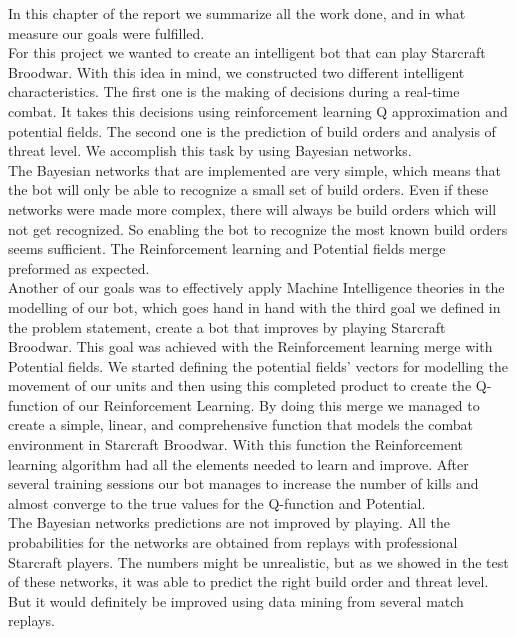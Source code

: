 In this chapter of the report we summarize all the work done, and in what measure our goals were fulfilled. \\

For this project we wanted to create an intelligent bot that can play Starcraft Broodwar. With this idea in mind, we constructed two different intelligent characteristics. The first one is the making of decisions during a real-time combat. It takes this decisions using reinforcement learning Q approximation and potential fields. The second one is the prediction of build orders and analysis of threat level. We accomplish this task by using Bayesian networks. \\

The Bayesian networks that are implemented are very simple, which means that the bot will only be able to recognize a small set of build orders. Even if these networks were made more complex, there will always be build orders which will not get recognized. So enabling the bot to recognize the most known build orders seems sufficient. The Reinforcement learning and Potential fields merge preformed as expected.\\ %

Another of our goals was to effectively apply Machine Intelligence theories in the modelling of our bot, which goes hand in hand with the third goal we defined in the problem statement, create a bot that improves by playing Starcraft Broodwar. This goal was achieved with the Reinforcement learning merge with Potential fields. We started defining the potential fields' vectors for modelling the movement of our units and then using this completed product to create the Q-function of our Reinforcement Learning. By doing this merge we managed to create a simple, linear, and comprehensive function that models the combat environment in Starcraft Broodwar. With this function the Reinforcement learning algorithm had all the elements needed to learn and improve. After several training sessions our bot manages to increase the number of kills and almost converge to the true values for the Q-function and Potential.\\

The Bayesian networks predictions are not improved by playing. All the probabilities for the networks are obtained from replays with professional Starcraft players. The numbers might be unrealistic, but as we showed in the test of these networks, it was able to predict the right build order and threat level. But it would definitely be improved using data mining from several match replays. \\

